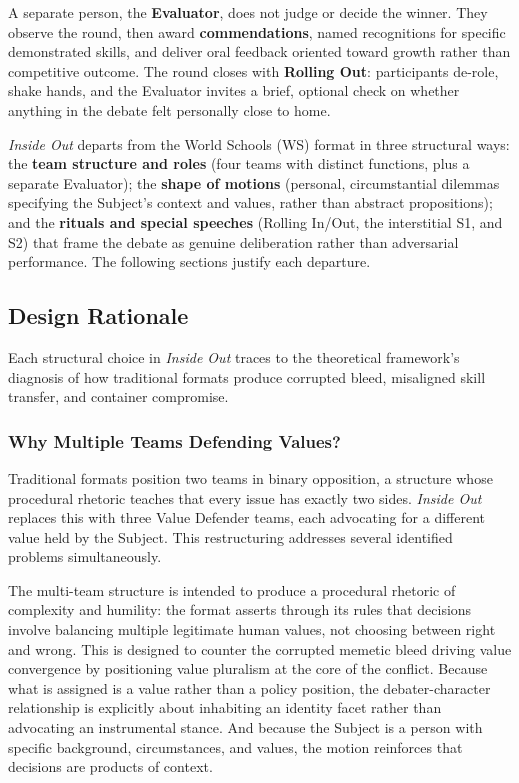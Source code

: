 A separate person, the \textbf{Evaluator}, does not judge or decide the winner. They observe the round, then award \textbf{commendations}, named recognitions for specific demonstrated skills, and deliver oral feedback oriented toward growth rather than competitive outcome. The round closes with \textbf{Rolling Out}: participants de-role, shake hands, and the Evaluator invites a brief, optional check on whether anything in the debate felt personally close to home.

\emph{Inside Out} departs from the World Schools (WS) format in three structural ways: the \textbf{team structure and roles} (four teams with distinct functions, plus a separate Evaluator); the \textbf{shape of motions} (personal, circumstantial dilemmas specifying the Subject's context and values, rather than abstract propositions); and the \textbf{rituals and special speeches} (Rolling In/Out, the interstitial S1, and S2) that frame the debate as genuine deliberation rather than adversarial performance. The following sections justify each departure.

\subsection{Design Rationale}

Each structural choice in \emph{Inside Out} traces to the theoretical framework's diagnosis of how traditional formats produce corrupted bleed, misaligned skill transfer, and container compromise.

\subsubsection{Why Multiple Teams Defending Values?}

Traditional formats position two teams in binary opposition, a structure whose procedural rhetoric \parencite{bogost2007persuasive} teaches that every issue has exactly two sides. \emph{Inside Out} replaces this with three Value Defender teams, each advocating for a different value held by the Subject. This restructuring addresses several identified problems simultaneously.

The multi-team structure is intended to produce a procedural rhetoric of complexity and humility: the format asserts through its rules that decisions involve balancing multiple legitimate human values, not choosing between right and wrong. This is designed to counter the corrupted memetic bleed driving value convergence by positioning value pluralism at the core of the conflict. Because what is assigned is a value rather than a policy position, the debater-character relationship is explicitly about inhabiting an identity facet rather than advocating an instrumental stance. And because the Subject is a person with specific background, circumstances, and values, the motion reinforces that decisions are products of context.

